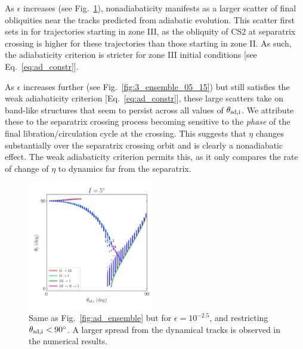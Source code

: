 \documentclass[
        fleqn,
        usenatbib,
    ]{mnras}
\begin{document}
As $\epsilon$ increases (see Fig.~\ref{fig:3_ensemble_05_25}), nonadiabaticity
manifests as a larger scatter of final obliquities near the tracks predicted
from adiabatic evolution. This scatter first sets in for trajectories starting
in zone III, as the obliquity of CS2 at separatrix crossing is higher for these
trajectories than those starting in zone II\@. As such, the adiabaticity criterion
is stricter for zone III initial conditions [see Eq.~\eqref{eq:ad_constr}].

As $\epsilon$ increases further (see Fig.~\ref{fig:3_ensemble_05_15}) but still
satisfies the weak adiabaticity criterion [Eq.~\eqref{eq:ad_constr}], these
large scatters take on band-like structures that seem to persist across all
values of $\theta_{\rm sd, i}$. We attribute these to the separatrix crossing
process becoming sensitive to the \emph{phase} of the final
libration/circulation cycle at the crossing. This suggests that $\eta$
changes substantially over the separatrix crossing orbit and is clearly a
nonadiabatic effect. The weak adiabaticity criterion permits this, as it only
compares the rate of change of $\eta$ to dynamics far from the separatrix.
\begin{figure}
    \centering
    \includegraphics[width=0.5\textwidth]{plots_diskdisp/3_ensemble_05_25.png}
    \caption{Same as Fig.~\ref{fig:ad_ensemble} but for $\epsilon = 10^{-2.5}$,
    and restricting $\theta_{\rm sd, i} < 90^\circ$. A larger spread from the
    dynamical tracks is observed in the numerical results.
    }\label{fig:3_ensemble_05_25}
\end{figure}
\end{document}
